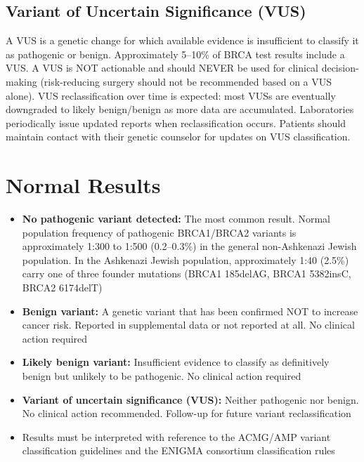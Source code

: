 \subsection*{Variant of Uncertain Significance (VUS)}
A VUS is a genetic change for which available evidence is insufficient to classify it as pathogenic or benign. Approximately 5--10\% of BRCA test results include a VUS. A VUS is NOT actionable and should NEVER be used for clinical decision-making (risk-reducing surgery should not be recommended based on a VUS alone). VUS reclassification over time is expected: most VUSs are eventually downgraded to likely benign/benign as more data are accumulated. Laboratories periodically issue updated reports when reclassification occurs. Patients should maintain contact with their genetic counselor for updates on VUS classification.

\section*{Normal Results}
\begin{itemize}
  \item \textbf{No pathogenic variant detected:} The most common result. Normal population frequency of pathogenic BRCA1/BRCA2 variants is approximately 1:300 to 1:500 (0.2--0.3\%) in the general non-Ashkenazi Jewish population. In the Ashkenazi Jewish population, approximately 1:40 (2.5\%) carry one of three founder mutations (BRCA1 185delAG, BRCA1 5382insC, BRCA2 6174delT)
  \item \textbf{Benign variant:} A genetic variant that has been confirmed NOT to increase cancer risk. Reported in supplemental data or not reported at all. No clinical action required
  \item \textbf{Likely benign variant:} Insufficient evidence to classify as definitively benign but unlikely to be pathogenic. No clinical action required
  \item \textbf{Variant of uncertain significance (VUS):} Neither pathogenic nor benign. No clinical action recommended. Follow-up for future variant reclassification
  \item Results must be interpreted with reference to the ACMG/AMP variant classification guidelines and the ENIGMA consortium classification rules
\end{itemize}

